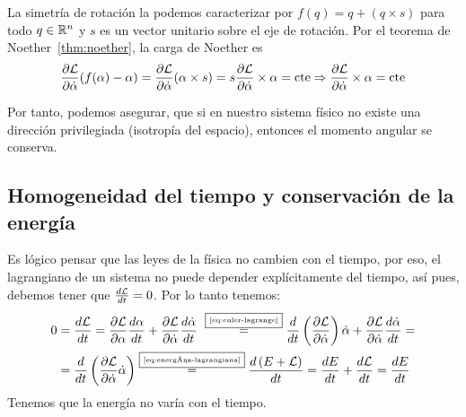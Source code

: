 La simetría de rotación la podemos caracterizar por $f(q)=q+(q\times s)$ para todo $q\in\mathbb{R}^n$ y $s$ es un vector unitario sobre el eje de rotación.
Por el teorema de Noether~\eqref{thm:noether}, la carga de Noether es
\begin{equation}
	\label{eq:conservacion_momento_angular}
	\frac{\partial \mathcal{L}}{\partial\dot{\alpha}}(f(\alpha)-\alpha) = \frac{\partial \mathcal{L}}{\partial\dot{\alpha}}(\alpha\times s) = s \frac{\partial \mathcal{L}}{\partial\dot{\alpha}}\times \alpha=\text{cte}\Rightarrow\frac{\partial \mathcal{L}}{\partial\dot{\alpha}}\times \alpha=\text{cte}
\end{equation}

Por tanto, podemos asegurar, que si en nuestro sistema físico no existe una dirección privilegiada (isotropía del espacio), entonces el momento angular se conserva.

\subsection{Homogeneidad del tiempo y conservación de la energía}\label{subsec:homogeneidad-del-tiempo-y-conservación-de-la-energía}
Es lógico pensar que las leyes de la física no cambien con el tiempo, por eso, el lagrangiano de un sistema no puede depender explícitamente del tiempo, así pues, debemos tener que $\frac{d\mathcal{L}}{dt}=0$.
Por lo tanto tenemos:
\begin{align*}
	0 & = \frac{d\mathcal{L}}{dt}=\frac{\partial \mathcal{L}}{\partial \alpha}\frac{d\alpha}{dt}+\frac{\partial \mathcal{L}}{\partial \dot{\alpha}}\frac{d\dot{\alpha}}{dt} ~\overset{\fbox{\tiny \ref{eq:euler-lagrange}}}{=} \frac{d}{dt}\left(\frac{\partial \mathcal{L}}{\partial \dot{\alpha}}\right)\dot{\alpha}+\frac{\partial \mathcal{L}}{\partial \dot{\alpha}}\frac{d\dot{\alpha}}{dt}=\\
	& = \frac{d}{dt}\left(\frac{\partial \mathcal{L}}{\partial \dot{\alpha}}\dot{\alpha}\right)\overset{\fbox{\tiny \ref{eq:energía-lagrangiana}}}{=}\frac{d\left(E+\mathcal{L}\right)}{dt}=\frac{d E}{dt}+\frac{d\mathcal{L}}{dt}=\frac{d E}{dt}
\end{align*}
Tenemos que la energía no varía con el tiempo.
